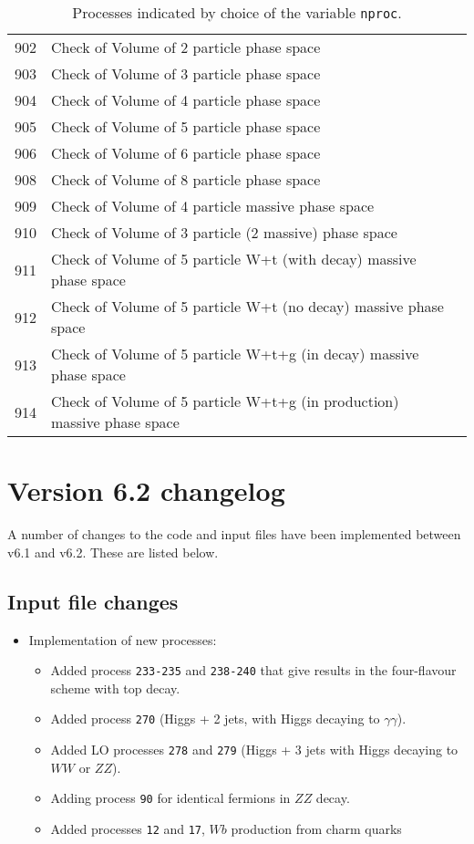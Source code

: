 \documentclass[12pt]{article}
\begin{document}
\clearpage
\begin{table}
\begin{center}
\begin{tabular}{|l|l|l|}
\hline
902 & Check of Volume of 2 particle phase space & \\  
903 & Check of Volume of 3 particle phase space & \\  
904 & Check of Volume of 4 particle phase space & \\  
905 & Check of Volume of 5 particle phase space & \\  
906 & Check of Volume of 6 particle phase space & \\  
908 & Check of Volume of 8 particle phase space & \\  
909 & Check of Volume of 4 particle massive phase space & \\  
910 & Check of Volume of 3 particle (2 massive) phase space & \\  
911 & Check of Volume of 5 particle W+t (with decay) massive phase space & \\  
912 & Check of Volume of 5 particle W+t (no decay) massive phase space & \\  
913 & Check of Volume of 5 particle W+t+g (in decay) massive phase space & \\  
914 & Check of Volume of 5 particle W+t+g (in production) massive phase space & \\  
\hline 
\hline
\end{tabular}
\end{center}
\caption{Processes indicated by choice of the variable {\tt nproc}.\label{nproctable}}
\end{table}
\clearpage

\section{Version 6.2 changelog}
\label{changelog6.2}

A number of changes to the code and input files have been implemented
between v6.1 and v6.2. These are listed below.

\subsection{Input file changes}
\begin{itemize}
\item Implementation of new processes:
\begin{itemize}
\item 
Added process {\tt 233-235} and {\tt 238-240} that give results in the four-flavour scheme
      with top decay.
\item 
Added process {\tt 270} (Higgs + 2 jets, with Higgs decaying to $\gamma \gamma$).
\item 
Added LO processes {\tt 278} and {\tt 279} (Higgs + 3 jets with Higgs decaying to $WW$ or $ZZ$).
\item 
Adding process {\tt 90} for identical fermions in $ZZ$ decay.
\item
Added processes {\tt 12} and {\tt 17}, $Wb$ production from charm quarks
\end{itemize}
\end{itemize}
\end{document}
